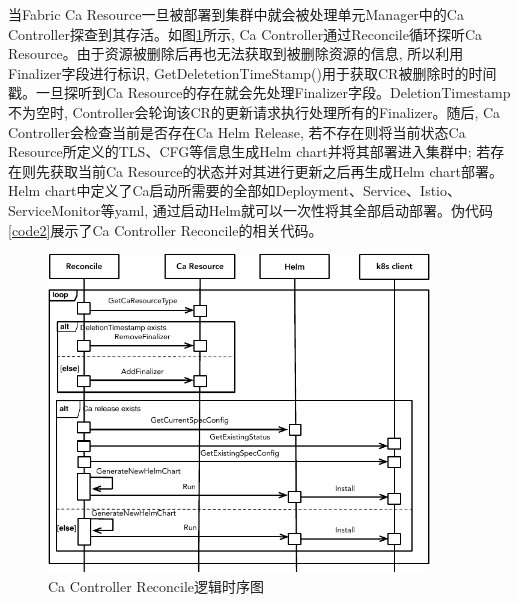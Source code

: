 当Fabric Ca Resource一旦被部署到集群中就会被处理单元Manager中的Ca  Controller探查到其存活。如图\ref{reconcile}所示, Ca Controller通过Reconcile循环探听Ca Resource。由于资源被删除后再也无法获取到被删除资源的信息, 所以利用Finalizer字段进行标识, GetDeletetionTimeStamp()用于获取CR被删除时的时间戳。一旦探听到Ca Resource的存在就会先处理Finalizer字段。DeletionTimestamp不为空时, Controller会轮询该CR的更新请求执行处理所有的Finalizer。随后, Ca Controller会检查当前是否存在Ca Helm Release, 若不存在则将当前状态Ca Resource所定义的TLS、CFG等信息生成Helm chart并将其部署进入集群中; 若存在则先获取当前Ca Resource的状态并对其进行更新之后再生成Helm chart部署。Helm chart中定义了Ca启动所需要的全部如Deployment、Service、Istio、ServiceMonitor等yaml, 通过启动Helm就可以一次性将其全部启动部署。伪代码\ref{code2}展示了Ca Controller Reconcile的相关代码。

\begin{figure}[!htbp] %
    \centering %
    \includegraphics[width=0.9\textwidth]{FIGs/chapter4/reconcile.pdf} %
    \caption{Ca Controller Reconcile逻辑时序图} %
    \label{reconcile} %
\end{figure}%

